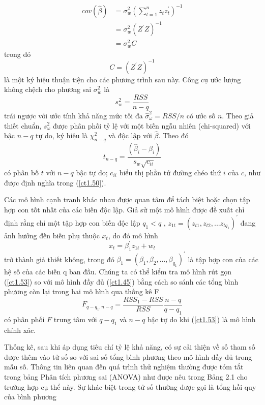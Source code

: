 \documentclass[12pt, a4paper,oneside]{book}
\theoremstyle{definition}
\begin{document}
\begin{align}
cov(\hat{\beta})&=\sigma_{w}^{2}(\sum_{t=1}^{n} z_{t}z_{t}^{'})^{-1}\\
&=\sigma_{w}^{2}(Z^{'}Z)^{-1}\\
&=\sigma_{w}^{2}C \label{2.8}
\end{align}
trong đó	
\begin{equation}
C=(Z^{'}Z)^{-1} \label{ct1.50}
\end{equation}
là một ký hiệu thuận tiện cho các phương trình sau này. Công cụ ước lượng không chệch cho phương sai $ \sigma_{w}^{2} $ là
\begin{equation}
s_{w}^{2}=\dfrac{RSS}{n-q} \label{ct1.51}
\end{equation}
trái ngược với ước tính khả năng mức tối đa $\hat{\sigma}_{\omega}^{2}=RSS/n$ có ước số $n$. Theo giả thiết chuẩn, $ s_{\omega}^{2} $ được phân phối tỷ lệ với một biến ngẫu nhiên (chi-squared) với bậc $ n - q $ tự do, ký hiệu là $ \chi_{n-q}^{2} $ và độc lập với $ \hat{\beta} $. Theo đó
\begin{equation}
t_{n-q}=\dfrac{(\hat{\beta}_{i}-\beta_{i})}{s_{w}\sqrt{c_{ii}}} \label{ct1.52}
\end{equation}
có phân bố $ t $ với $ n − q $ bậc tự do; $ c_{ii} $ biểu thị phần tử đường chéo thứ $ i $ của $ c $, như được định nghĩa trong (\ref{ct1.50}).

Các mô hình cạnh tranh khác nhau được quan tâm để tách biệt hoặc chọn tập hợp con tốt nhất của các biến độc lập. Giả sử một mô hình được đề xuất chỉ định rằng chỉ một tập hợp con biến độc lập $ q_{1}< q $ , $z_{1t}=(z_{t1}, z_{t2},...z_{tq_{1}})^{'}$ đang ảnh hưởng đến biến phụ thuộc $ x_{t} $, do đó mô hình 
\begin{equation}
x_{t}=\beta_{1}^{'}z_{1t}+w_{t} \label{ct1.53}
\end{equation}
trở thành giả thiết không, trong đó $\beta_{1}=(\beta_{1},\beta_{2},...,\beta_{q_{1}})^{'}$ là tập hợp con của các hệ số của các biến q ban đầu. Chúng ta có thể kiểm tra mô hình rút gọn (\ref{ct1.53}) so với mô hình đầy đủ (\ref{ct1.45}) bằng cách so sánh các tổng bình phương còn lại trong hai mô hình qua thống kê F
\begin{equation}
F_{q-q_{1}, n-q}=\frac{RSS_{1}-RSS}{RSS}\dfrac{n-q}{q-q_{1}} \label{ct1.54}
\end{equation}
có phân phối $ F $ trung tâm với $ q-q_{1} $ và $ n-q $ bậc tự do khi (\ref{ct1.53}) là mô hình chính xác.

Thống kê, sau khi áp dụng tiêu chí tỷ lệ khả năng, có sự cải thiện về số tham số được thêm vào tử số so với sai số tổng bình phương theo mô hình đầy đủ trong mẫu số. Thông tin liên quan đến quá trình thử nghiệm thường được tóm tắt trong bảng Phân tích phương sai (ANOVA) như được nêu trong Bảng 2.1 cho trường hợp cụ thể này. Sự khác biệt trong tử số thường được gọi là tổng hồi quy của bình phương 
\end{document}
